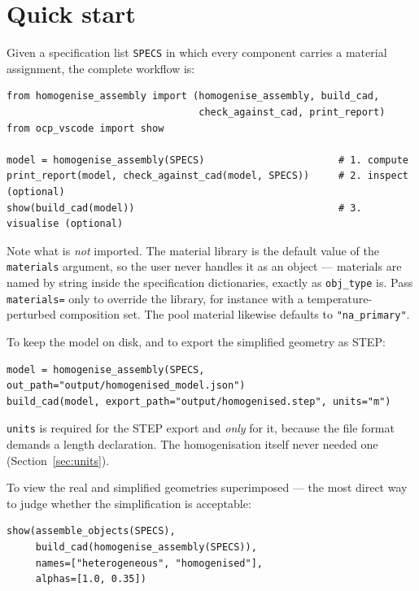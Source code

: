 \documentclass[9pt,a4paper]{extarticle}
\newcommand{\code}[1]{\texttt{\small #1}}
\begin{document}
\section{Quick start}

Given a specification list \code{SPECS} in which every component carries a
material assignment, the complete workflow is:

\begin{lstlisting}[style=py]
from homogenise_assembly import (homogenise_assembly, build_cad,
                                 check_against_cad, print_report)
from ocp_vscode import show

model = homogenise_assembly(SPECS)                       # 1. compute
print_report(model, check_against_cad(model, SPECS))     # 2. inspect  (optional)
show(build_cad(model))                                   # 3. visualise (optional)
\end{lstlisting}

\noindent
Note what is \emph{not} imported. The material library is the default value of
the \code{materials} argument, so the user never handles it as an object ---
materials are named by string inside the specification dictionaries, exactly as
\code{obj\_type} is. Pass \code{materials=} only to override the library, for
instance with a temperature-perturbed composition set. The pool material
likewise defaults to \code{"na\_primary"}.

To keep the model on disk, and to export the simplified geometry as STEP:

\begin{lstlisting}[style=py]
model = homogenise_assembly(SPECS, out_path="output/homogenised_model.json")
build_cad(model, export_path="output/homogenised.step", units="m")
\end{lstlisting}

\noindent
\code{units} is required for the STEP export and \emph{only} for it, because the
file format demands a length declaration. The homogenisation itself never needed
one (Section~\ref{sec:units}).

To view the real and simplified geometries superimposed --- the most direct way
to judge whether the simplification is acceptable:

\begin{lstlisting}[style=py]
show(assemble_objects(SPECS),
     build_cad(homogenise_assembly(SPECS)),
     names=["heterogeneous", "homogenised"],
     alphas=[1.0, 0.35])
\end{lstlisting}
\end{document}
